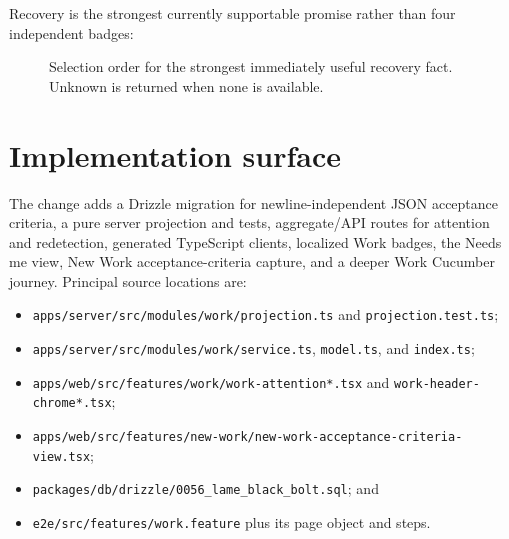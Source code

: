 \documentclass[10pt,a4paper]{article}
\newcommand{\code}[1]{\texttt{#1}}
\begin{document}
Recovery is the strongest currently supportable promise rather than four
independent badges:

\begin{figure}[ht]
\centering
{}
\caption{Selection order for the strongest immediately useful recovery fact.
Unknown is returned when none is available.}
\end{figure}

\section{Implementation surface}

The change adds a Drizzle migration for newline-independent JSON acceptance
criteria, a pure server projection and tests, aggregate/API routes for attention
and redetection, generated TypeScript clients, localized Work badges, the Needs
me view, New Work acceptance-criteria capture, and a deeper Work Cucumber
journey.  Principal source locations are:

\begin{itemize}
  \item \code{apps/server/src/modules/work/projection.ts} and
        \code{projection.test.ts};
  \item \code{apps/server/src/modules/work/service.ts}, \code{model.ts}, and
        \code{index.ts};
  \item \code{apps/web/src/features/work/work-attention*.tsx} and
        \code{work-header-chrome*.tsx};
  \item \code{apps/web/src/features/new-work/new-work-acceptance-criteria-view.tsx};
  \item \code{packages/db/drizzle/0056\_lame\_black\_bolt.sql}; and
  \item \code{e2e/src/features/work.feature} plus its page object and steps.
\end{itemize}
\end{document}
